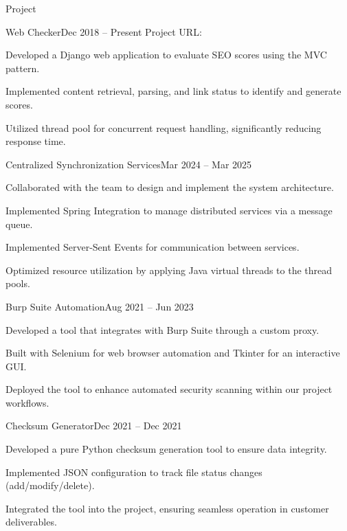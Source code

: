 \documentclass[12pt,a4paper]{cv}
\begin{document}
\begin{cvSection}{Project}

	\begin{cvSubsection}{Web Checker}{Dec 2018 -- Present}{
			Project URL: 
		}
		\item Developed a Django web application to evaluate SEO scores using the MVC pattern.
		\item Implemented content retrieval, parsing, and link status to identify and generate scores.
		\item Utilized thread pool for concurrent request handling, significantly reducing response time.
	\end{cvSubsection}


	\begin{cvSubsection}{Centralized Synchronization Services}{Mar 2024 -- Mar 2025}{}
		\item Collaborated with the team to design and implement the system architecture.
		\item Implemented Spring Integration to manage distributed services via a message queue.
		\item Implemented Server-Sent Events for communication between services.
		\item Optimized resource utilization by applying Java virtual threads to the thread pools.
	\end{cvSubsection}


	\begin{cvSubsection}{Burp Suite Automation}{Aug 2021 -- Jun 2023}{}
		\item Developed a tool that integrates with Burp Suite through a custom proxy.
		\item Built with Selenium for web browser automation and Tkinter for an interactive GUI.
		\item Deployed the tool to enhance automated security scanning within our project workflows.
	\end{cvSubsection}


	\begin{cvSubsection}{Checksum Generator}{Dec 2021 -- Dec 2021}{}
		\item Developed a pure Python checksum generation tool to ensure data integrity.
		\item Implemented JSON configuration to track file status changes (add/modify/delete).
		\item Integrated the tool into the project, ensuring seamless operation in customer deliverables.
	\end{cvSubsection}

\end{cvSection}
\end{document}
